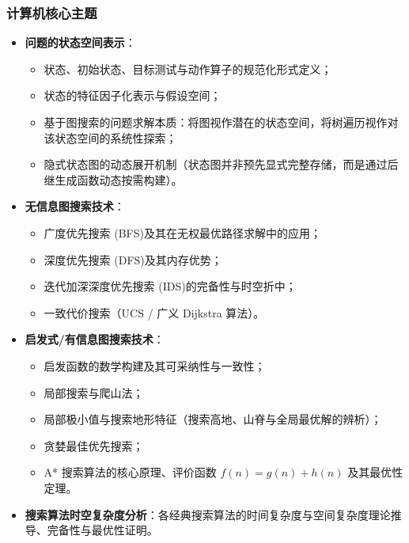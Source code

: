 \subsubsection{计算机核心主题}
\begin{itemize}
    \item \textbf{问题的状态空间表示}：
    \begin{itemize}
        \item 状态、初始状态、目标测试与动作算子的规范化形式定义；
        \item 状态的特征因子化表示与假设空间；
        \item 基于图搜索的问题求解本质：将图视作潜在的状态空间，将树遍历视作对该状态空间的系统性探索；
        \item 隐式状态图的动态展开机制（状态图并非预先显式完整存储，而是通过后继生成函数动态按需构建）。
    \end{itemize}
    \item \textbf{无信息图搜索技术}：
    \begin{itemize}
        \item 广度优先搜索 (BFS)及其在无权最优路径求解中的应用；
        \item 深度优先搜索 (DFS)及其内存优势；
        \item 迭代加深深度优先搜索 (IDS)的完备性与时空折中；
        \item 一致代价搜索（UCS / 广义 Dijkstra 算法）。
    \end{itemize}
    \item \textbf{启发式/有信息图搜索技术}：
    \begin{itemize}
        \item 启发函数的数学构建及其可采纳性与一致性；
        \item 局部搜索与爬山法；
        \item 局部极小值与搜索地形特征（搜索高地、山脊与全局最优解的辨析）；
        \item 贪婪最佳优先搜索；
        \item A* 搜索算法的核心原理、评价函数 $f(n) = g(n) + h(n)$ 及其最优性定理。
    \end{itemize}
    \item \textbf{搜索算法时空复杂度分析}：各经典搜索算法的时间复杂度与空间复杂度理论推导、完备性与最优性证明。
\end{itemize}

